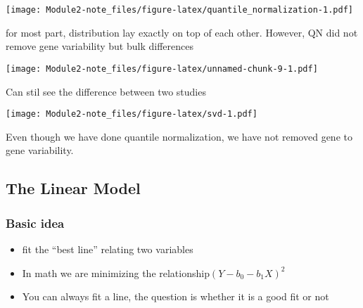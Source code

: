 \documentclass[]{article}
\newenvironment{Shaded}{\begin{snugshade}}{\end{snugshade}}
\newcommand{\KeywordTok}[1]{\textcolor[rgb]{0.13,0.29,0.53}{\textbf{#1}}}
\newcommand{\DataTypeTok}[1]{\textcolor[rgb]{0.13,0.29,0.53}{#1}}
\newcommand{\DecValTok}[1]{\textcolor[rgb]{0.00,0.00,0.81}{#1}}
\newcommand{\StringTok}[1]{\textcolor[rgb]{0.31,0.60,0.02}{#1}}
\newcommand{\OperatorTok}[1]{\textcolor[rgb]{0.81,0.36,0.00}{\textbf{#1}}}
\newcommand{\NormalTok}[1]{#1}
\providecommand{\tightlist}{%
  \setlength{\itemsep}{0pt}\setlength{\parskip}{0pt}}
\begin{document}
\texttt{[image: Module2-note\_files/figure-latex/quantile\_normalization-1.pdf]}

for most part, distribution lay exactly on top of each other. However,
QN did not remove gene variability but bulk differences

\begin{Shaded}
\end{Shaded}

\texttt{[image: Module2-note\_files/figure-latex/unnamed-chunk-9-1.pdf]}

Can stil see the difference between two studies

\begin{Shaded}
\end{Shaded}

\texttt{[image: Module2-note\_files/figure-latex/svd-1.pdf]}

Even though we have done quantile normalization, we have not removed
gene to gene variability.

\subsection{The Linear Model}\label{the-linear-model}

\subsubsection{Basic idea}\label{basic-idea}

\begin{itemize}
\tightlist
\item
  fit the ``best line'' relating two variables
\item
  In math we are minimizing the relationship\((Y-b_0 - b_1X)^2\)
\item
  You can always fit a line, the question is whether it is a good fit or
  not
\end{itemize}
\end{document}
